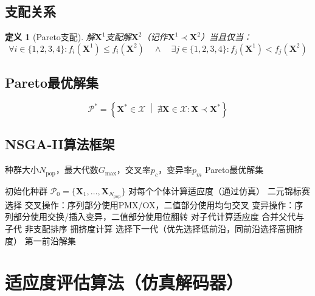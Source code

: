 \documentclass[11pt,a4paper]{article}
\newtheorem{definition}{定义}[section]
\begin{document}
\subsection{支配关系}

\begin{definition}[Pareto支配]
解$\mathbf{X}^1$支配解$\mathbf{X}^2$（记作$\mathbf{X}^1 \prec \mathbf{X}^2$）当且仅当：
\begin{equation}
    \forall i \in \{1,2,3,4\}: f_i(\mathbf{X}^1) \leq f_i(\mathbf{X}^2) \quad \land \quad \exists j \in \{1,2,3,4\}: f_j(\mathbf{X}^1) < f_j(\mathbf{X}^2)
\end{equation}
\end{definition}

\subsection{Pareto最优解集}

\begin{equation}
    \mathcal{P}^* = \left\{ \mathbf{X}^* \in \mathcal{X} \; \middle| \; \nexists \mathbf{X} \in \mathcal{X}: \mathbf{X} \prec \mathbf{X}^* \right\}
\end{equation}

\subsection{NSGA-II算法框架}

\begin{algorithm}[H]
\caption{NSGA-II主框架}
\begin{algorithmic}[1]
\Require 种群大小$N_{\text{pop}}$，最大代数$G_{\max}$，交叉率$p_c$，变异率$p_m$
\Ensure Pareto最优解集

\State 初始化种群 $\mathcal{P}_0 = \{\mathbf{X}_1, \ldots, \mathbf{X}_{N_{\text{pop}}}\}$
\State 对每个个体计算适应度（通过仿真）
    \State 二元锦标赛选择
    \State 交叉操作：序列部分使用PMX/OX，二值部分使用均匀交叉
    \State 变异操作：序列部分使用交换/插入变异，二值部分使用位翻转
    \State 对子代计算适应度
    \State 合并父代与子代
    \State 非支配排序
    \State 拥挤度计算
    \State 选择下一代（优先选择低前沿，同前沿选择高拥挤度）
\EndFor
\State \Return 第一前沿解集
\end{algorithmic}
\end{algorithm}

\section{适应度评估算法（仿真解码器）}
\end{document}
